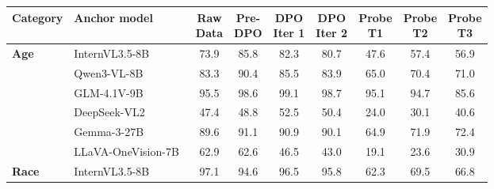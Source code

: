 \documentclass[lettersize,journal]{IEEEtran}
\begin{document}
\begin{table}[t]
\centering
\small
\renewcommand\arraystretch{1.15}
\setlength{\tabcolsep}{5pt}
\begin{tabular}{l|l|ccccccc}
\toprule
\textbf{Category} & \textbf{Anchor model} & \makecell{\textbf{Raw}\\\textbf{Data}} & \makecell{\textbf{Pre-}\\\textbf{DPO}} & \makecell{\textbf{DPO}\\\textbf{Iter 1}} & \makecell{\textbf{DPO}\\\textbf{Iter 2}} & \makecell{\textbf{Probe}\\\textbf{T1}} & \makecell{\textbf{Probe}\\\textbf{T2}} & \makecell{\textbf{Probe}\\\textbf{T3}} \\
\midrule
\multirow{6}{*}{\textbf{Age}}
 & InternVL3.5-8B~\cite{internvl35}        & 73.9 & \cellcolor{green!15}85.8 & 82.3 & 80.7 & \cellcolor{red!30}47.6 & \cellcolor{red!15}57.4 & \cellcolor{red!15}56.9 \\
 & Qwen3-VL-8B~\cite{qwen3vl}              & 83.3 & \cellcolor{green!30}90.4 & \cellcolor{green!15}85.5 & 83.9 & \cellcolor{red!15}65.0 & 70.4 & 71.0 \\
 & GLM-4.1V-9B~\cite{glm41v}               & \cellcolor{green!30}95.5 & \cellcolor{green!30}98.6 & \cellcolor{green!30}99.1 & \cellcolor{green!30}98.7 & \cellcolor{green!30}95.1 & \cellcolor{green!30}94.7 & \cellcolor{green!15}85.6 \\
 & DeepSeek-VL2~\cite{deepseekvl2}         & \cellcolor{red!30}47.4 & \cellcolor{red!30}48.8 & \cellcolor{red!15}52.5 & \cellcolor{red!15}50.4 & \cellcolor{red!30}24.0 & \cellcolor{red!30}30.1 & \cellcolor{red!30}40.6 \\
 & Gemma-3-27B~\cite{gemma3}               & \cellcolor{green!15}89.6 & \cellcolor{green!30}91.1 & \cellcolor{green!30}90.9 & \cellcolor{green!30}90.1 & \cellcolor{red!15}64.9 & 71.9 & 72.4 \\
 & LLaVA-OneVision-7B~\cite{llava_onevision} & \cellcolor{red!15}62.9 & \cellcolor{red!15}62.6 & \cellcolor{red!30}46.5 & \cellcolor{red!30}43.0 & \cellcolor{red!30}19.1 & \cellcolor{red!30}23.6 & \cellcolor{red!30}30.9 \\
\midrule
\multirow{6}{*}{\textbf{Race}}
 & InternVL3.5-8B~\cite{internvl35}        & \cellcolor{green!30}97.1 & \cellcolor{green!30}94.6 & \cellcolor{green!30}96.5 & \cellcolor{green!30}95.8 & \cellcolor{red!15}62.3 & \cellcolor{red!15}69.5 & \cellcolor{red!15}66.8 \\

\end{tabular}
\end{table}
\end{document}
